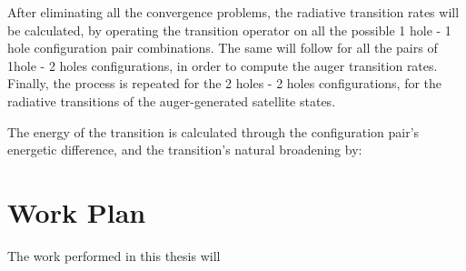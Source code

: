  After eliminating all the convergence problems, the radiative transition rates will be calculated, by operating the transition operator on all the possible 1 hole - 1 hole configuration pair combinations. The same will follow for all the pairs of 1hole - 2 holes configurations, in order to compute the auger transition rates. Finally, the process is repeated for the 2 holes - 2 holes configurations, for the radiative transitions of the auger-generated satellite states.

 The energy of the transition is calculated through the configuration pair's energetic difference, and the transition's natural broadening by:




\section{Work Plan}

The work performed in this thesis will 
